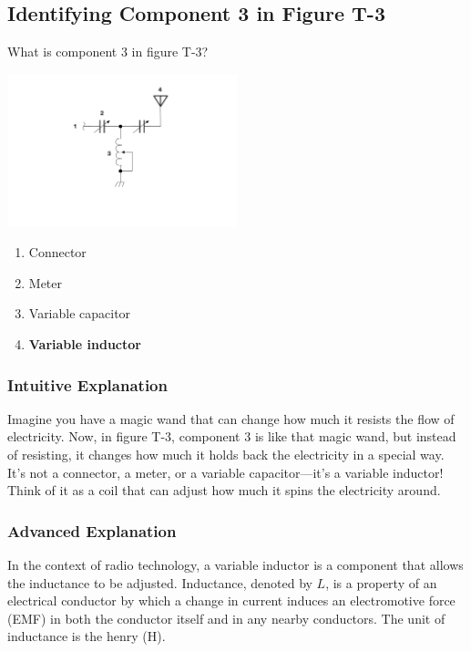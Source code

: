 \subsection{Identifying Component 3 in Figure T-3}
\label{T6C10}

\begin{tcolorbox}[colback=gray!10!white,colframe=black!75!black,title=T6C10]
What is component 3 in figure T-3?

\includegraphics[width=0.5\textwidth]{tech/images/t3.png} 

\begin{enumerate}[label=\Alph*)]
    \item Connector
    \item Meter
    \item Variable capacitor
    \item \textbf{Variable inductor}
\end{enumerate}
\end{tcolorbox}

\subsubsection{Intuitive Explanation}
Imagine you have a magic wand that can change how much it resists the flow of electricity. Now, in figure T-3, component 3 is like that magic wand, but instead of resisting, it changes how much it holds back the electricity in a special way. It's not a connector, a meter, or a variable capacitor—it's a variable inductor! Think of it as a coil that can adjust how much it spins the electricity around.

\subsubsection{Advanced Explanation}
In the context of radio technology, a variable inductor is a component that allows the inductance to be adjusted. Inductance, denoted by \( L \), is a property of an electrical conductor by which a change in current induces an electromotive force (EMF) in both the conductor itself and in any nearby conductors. The unit of inductance is the henry (H).


